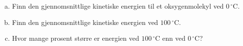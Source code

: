 %
\begin{enumerate}[a)]
    \item Finn den gjennomsnittlige kinetiske energien til et oksygenmolekyl ved $0\,^\circ$C.
    \item Finn den gjennomsnittlige kinetiske energien ved $100\,^\circ$C.
    \item Hvor mange prosent større er energien ved $100\,^\circ$C enn ved $0\,^\circ$C?
\end{enumerate}
%
